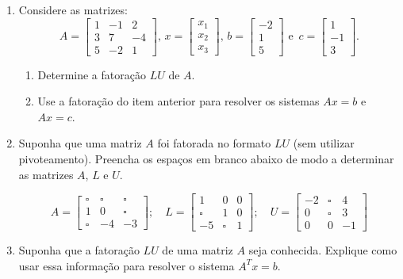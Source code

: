 \documentclass[11pt,a4paper]{article}
\begin{document}
\begin{enumerate}
  \item Considere as matrizes:
$$A=\begin{bmatrix}1 & - 1 & 2 \\ 3 & 7 & -4 \\ 5 & -2 & 1\end{bmatrix}, \, 
x=\begin{bmatrix}x_1 \\ x_2 \\ x_3\end{bmatrix}, \, 
b=\begin{bmatrix}-2 \\ 1 \\ 5\end{bmatrix} \textrm{ e }\,
c=\begin{bmatrix}1 \\ -1 \\ 3\end{bmatrix}. 
$$

  \begin{enumerate}
    \item Determine a fatoração $LU$ de $A$.
    \item Use a fatoração do item anterior para resolver os sistemas $Ax = b$ e $Ax = c$.
  \end{enumerate}

  \item Suponha que uma matriz $A$ foi fatorada no formato $LU$ (sem utilizar pivoteamento). Preencha os espaços em branco abaixo de modo a determinar 
as matrizes $A$, $L$ e $U$.

$$
A=\begin{bmatrix}\square & \square & \square \\ 1 & 0 & \square \\ \square & -4 & -3\end{bmatrix};\quad
L=\begin{bmatrix}1 & 0 & 0 \\ \square & 1 & 0 \\ -5 & \square & 1\end{bmatrix};\quad
U=\begin{bmatrix}-2 & \square & 4 \\ 0 & \square & 3 \\ 0 & 0 & -1\end{bmatrix}
$$

 \item Suponha que a fatoração $LU$ de uma matriz $A$ seja conhecida. Explique como usar essa informação para resolver o 
sistema $A^Tx = b$.

\end{enumerate}
\end{document}
